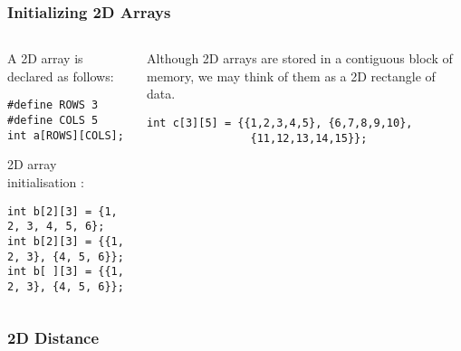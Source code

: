 \begin{frame}[fragile]
\frametitle{Initializing 2D Arrays}
\begin{columns}

\begin{column}{0.45\textwidth}
A 2D array is declared as follows:
\begin{verbatim}
#define ROWS 3
#define COLS 5
int a[ROWS][COLS];
\end{verbatim}
 2D array initialisation :
\begin{verbatim}
int b[2][3] = {1, 2, 3, 4, 5, 6};
int b[2][3] = {{1, 2, 3}, {4, 5, 6}};
int b[ ][3] = {{1, 2, 3}, {4, 5, 6}};
\end{verbatim}
\end{column}

\begin{column}{0.45\textwidth}
Although 2D arrays are stored in a contiguous block of memory,
we may think of them as a 2D rectangle of data.
\begin{verbatim}
int c[3][5] = {{1,2,3,4,5}, {6,7,8,9,10},
                {11,12,13,14,15}};
\end{verbatim}
\begin{center}
\begin{figure}[h]
\end{figure}
\end{center}
\end{column}

\end{columns}
\end{frame}

\begin{frame}[fragile]
\frametitle{2D Distance}

\begin{columns}
\begin{column}{0.45\textwidth}

\end{column}

\begin{column}{0.45\textwidth}
\end{column}
\end{columns}
\end{frame}


